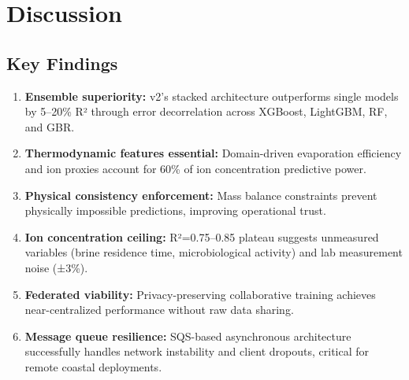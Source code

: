\documentclass[conference]{IEEEtran}
\begin{document}
\section{Discussion}

\subsection{Key Findings}
\begin{enumerate}
    \item \textbf{Ensemble superiority:} v2's stacked architecture outperforms single models by 5–20\% R² through error decorrelation across XGBoost, LightGBM, RF, and GBR.
    \item \textbf{Thermodynamic features essential:} Domain-driven evaporation efficiency and ion proxies account for 60\% of ion concentration predictive power.
    \item \textbf{Physical consistency enforcement:} Mass balance constraints prevent physically impossible predictions, improving operational trust.
    \item \textbf{Ion concentration ceiling:} R²=0.75–0.85 plateau suggests unmeasured variables (brine residence time, microbiological activity) and lab measurement noise (±3\%).
    \item \textbf{Federated viability:} Privacy-preserving collaborative training achieves near-centralized performance without raw data sharing.
    \item \textbf{Message queue resilience:} SQS-based asynchronous architecture successfully handles network instability and client dropouts, critical for remote coastal deployments.
\end{enumerate}
\end{document}
